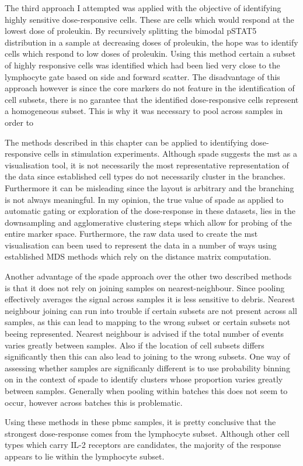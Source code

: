 The third approach I attempted was applied with the objective of identifying highly sensitive dose-responsive cells.
These are cells which would respond at the lowest dose of proleukin.
By recursively splitting the bimodal pSTAT5 distribution in a sample at decreasing doses of proleukin, the hope was to identify cells which respond to low doses of proleukin.
Using this method certain a subset of highly responsive cells was identified which had been lied very close to the lymphocyte gate based on side and forward scatter.
The disadvantage of this approach however is since the core markers do not feature in the identification of cell subsets, there is no garantee that the identified
dose-responsive cells represent a homogeneous subset.  This is why it was necessary to pool across samples in order to 

The methods described in this chapter can be applied to identifying dose-responsive cells in stimulation experiments.
Although spade suggests the mst as a visualisation tool, it is not necessarily the most representative representation of the data since
established cell types do not necessarily cluster in the branches.
Furthermore it can be misleading since the layout is arbitrary and the branching is not always meaningful.
In my opinion, the true value of spade as applied to automatic gating or exploration of the dose-response in these datasets,
lies in the downsampling and agglomerative clustering steps which allow for probing of the entire marker space.
Furthermore, the raw data used to create the mst visualisation can been used to represent the data in a number of ways using established
MDS methods which rely on the distance matrix computation.

Another advantage of the spade approach over the other two described methods is that it does not rely on joining samples on nearest-neighbour.
Since pooling effectively averages the signal across samples it is less sensitive to debris.
Nearest neighbour joining can run into trouble if certain subsets are not present across all samples, as this can lead to mapping to the wrong subset
or certain subsets not beeing represented.
Nearest neighbour is advised if the total number of events varies greatly between samples.
Also if the location of cell subsets differs significantly then this can also lead to joining to the wrong subsets.
One way of assessing whether samples are significanly different is to use probability binning on in the context of spade to identify clusters whose proportion
varies greatly between samples.  Generally when pooling within batches this does not seem to occur, however across batches this is problematic. 


Using these methods in these pbmc samples, it is pretty conclusive that the strongest dose-response comes from the lymphocyte subset.
Although other cell types which carry IL-2 receptors are candidates, the majority of the response appears to lie within the lymphocyte subset.









